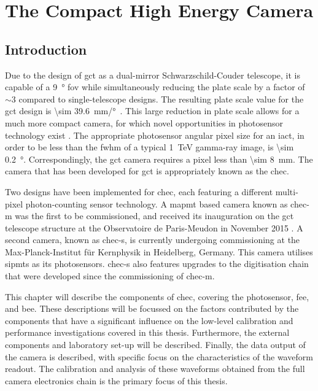 \chapter{\label{ch2-mechanics} The Compact High Energy Camera}

\minitoc

\section{Introduction}

Due to the design of \gls{gct} as a dual-mirror Schwarzschild-Couder telescope, it is capable of a \SI{9}{\degree} \gls{fov} while simultaneously reducing the plate scale by a factor of ${\sim} 3$ compared to single-telescope designs. The resulting plate scale value for the \gls{gct} design is \SI{\sim 39.6}{mm/\degree}~\cite{Rulten2016}. This large reduction in plate scale allows for a much more compact camera, for which novel opportunities in photosensor technology exist \cite{Vassiliev2007}. The appropriate photosensor angular pixel size for an \mbox{\gls{iact}}, in order to be less than the \gls{fwhm} of a typical \SI{1}{TeV} gamma-ray image, is \SI{\sim 0.2}{\degree}. Correspondingly, the \gls{gct} camera requires a pixel less than \SI{\sim 8}{mm}. The camera that has been developed for \gls{gct} is appropriately known as the \gls{chec}.

Two designs have been implemented for \gls{chec}, each featuring a different multi-pixel photon-counting sensor technology. A \gls{mapmt} based camera known as \gls{chec-m} was the first to be commissioned, and received its inauguration on the \gls{gct} telescope structure at the Observatoire de Paris-Meudon in November 2015 \cite{Watson2017}. A second camera, known as \gls{chec-s}, is currently undergoing commissioning at the Max-Planck-Institut für Kernphysik in Heidelberg, Germany. This camera utilises \glspl{sipmt} as its photosensors. \gls{chec-s} also features upgrades to the digitisation chain that were developed since the commissioning of \gls{chec-m}.

This chapter will describe the components of \gls{chec}, covering the photosensor, \gls{fee}, and \gls{bee}. These descriptions will be focussed on the factors contributed by the components that have a significant influence on the low-level calibration and performance investigations covered in this thesis. Furthermore, the external components and laboratory set-up will be described. Finally, the data output of the camera is described, with specific focus on the characteristics of the waveform readout. The calibration and analysis of these waveforms obtained from the full camera electronics chain is the primary focus of this thesis.

